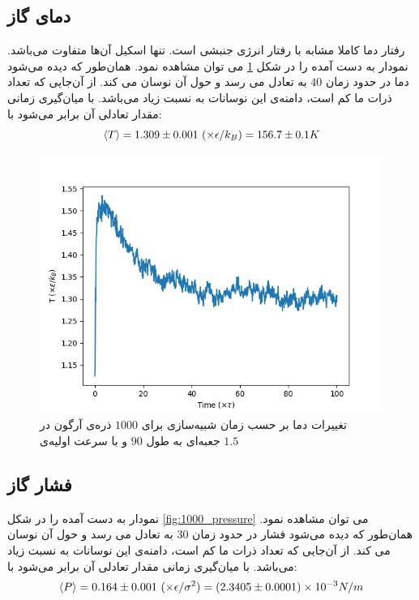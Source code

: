 \documentclass[11pt, a4paper]{article}
\begin{document}
\subsection{دمای گاز}
رفتار دما کاملا مشابه با رفتار انرژی جنبشی است. تنها اسکیل آن‌ها متفاوت می‌باشد.
نمودار به دست آمده را در شکل
\ref{fig:1000_temperature}
می توان مشاهده نمود.
همان‌طور که دیده می‌شود دما در حدود زمان
$40$
به تعادل می رسد و حول آن نوسان می کند.
از آن‌جایی که تعداد ذرات ما کم است، دامنه‌ی این نوسانات به نسبت زیاد می‌باشد.
با میان‌گیری زمانی مقدار تعادلی آن برابر می‌شود با:
\begin{equation}
  \braket{T} = 1.309 \pm 0.001 \ (\times \epsilon / k_B) = 156.7 \pm 0.1 K
\end{equation}

\begin{figure}[h!]
	\centering
  \includegraphics[width=.7\textwidth]{MD_90_1000_2_0.001_temperatures.jpg}
  \caption{تغییرات دما بر حسب زمان شبیه‌سازی برای $1000$ ذره‌ی آرگون در جعبه‌ای به طول $90$ و با سرعت اولیه‌ی $1.5$}
  \label{fig:1000_temperature}
\end{figure}


\subsection{فشار گاز}
نمودار به دست آمده را در شکل
\ref{fig:1000_pressure}
می توان مشاهده نمود.
همان‌طور که دیده می‌شود فشار در حدود زمان
$30$
به تعادل می رسد و حول آن نوسان می کند.
از آن‌جایی که تعداد ذرات ما کم است، دامنه‌ی این نوسانات به نسبت زیاد می‌باشد.
با میان‌گیری زمانی مقدار تعادلی آن برابر می‌شود با:
\begin{equation}
  \braket{P} = 0.164 \pm 0.001 \ (\times \epsilon / \sigma^2) = (2.3405 \pm 0.0001) \times 10^{-3} N/m
\end{equation}
\end{document}
